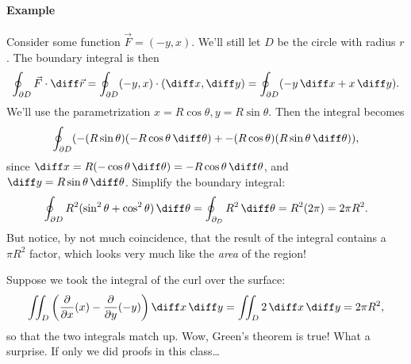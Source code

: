 \documentclass{multi}
\begin{document}
\paragraph{Example}

Consider some function \(\vec F = (-y, x)\). We'll still let \(D\) be the circle with radius \(r\). The boundary integral is then
\[
    \oint_{\partial D} \vec F \cdot \diff \vec r = 
    \oint_{\partial D} (-y, x) \cdot (\diff x, \diff y) =
    \oint_{\partial D} (-y \, \diff x + x \, \diff y).
\]
We'll use the parametrization \(x = R \cos \theta, y = R \sin \theta\). Then the integral becomes
\[
    \oint_{\partial D} (-(R \sin \theta) (-R \cos \theta \, \diff \theta) +
                        -(R \cos \theta) (R \sin \theta \, \diff \theta)),
\]
since \(\diff x = R (-\cos \theta \, \diff \theta) = -R \cos \theta \, \diff \theta\), and \(\diff y = R \sin \theta \, \diff \theta\). Simplify the boundary integral:
\[
    \oint_{\partial D} R^2 (\sin^2 \theta + \cos^2 \theta) \, \diff \theta = \oint_{\partial_D} R^2 \, \diff \theta
    = R^2 (2 \pi) = 2 \pi R^2.
\]
But notice, by not much coincidence, that the result of the integral contains a \(\pi R^2\) factor, which looks very much like the \emph{area} of the region! 

Suppose we took the integral of the curl over the surface:
\[
    \iint_D \left(\frac{\partial}{\partial x} (x) - \frac{\partial}{\partial y} (-y)\right) \diff x \, \diff y =
    \iint_D 2 \, \diff x \, \diff y = 2 \pi R^2,
\]
so that the two integrals match up. Wow, Green's theorem is true! What a surprise. {\tiny If only we did proofs in this class\dots}
\end{document}

